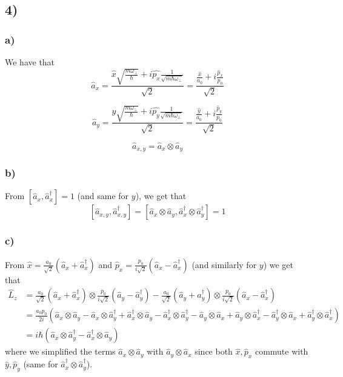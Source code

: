 \documentclass[10pt,a4paper]{book}
\begin{document}
\subsection*{4)}

\subsubsection*{a)}

We have that 
$$\hat{a}_x=\frac{\hat{x}\sqrt{\frac{m\omega_{\perp}}{\hbar}}+i\hat{p_x}\frac{1}{\sqrt{m\hbar\omega_{\perp}}}}{\sqrt{2}}=\frac{\frac{\hat{x}}{a_0}+i\frac{\hat{p}_x}{p_0}}{\sqrt{2}}$$

$$\hat{a}_y=\frac{\hat{y}\sqrt{\frac{m\omega_{\perp}}{\hbar}}+i\hat{p_y}\frac{1}{\sqrt{m\hbar\omega_{\perp}}}}{\sqrt{2}}=\frac{\frac{\hat{y}}{a_0}+i\frac{\hat{p}_y}{p_0}}{\sqrt{2}}$$

$$\hat{a}_{x,y}=\hat{a}_x\otimes\hat{a}_y$$

\subsubsection*{b)}
From $[\hat{a}_x,\hat{a}^{\dagger}_x]=1$ (and same for $y$), we get that 
$$[\hat{a}_{x,y},\hat{a}^{\dagger}_{x,y}]=[\hat{a}_x\otimes\hat{a}_y,\hat{a}^{\dagger}_x\otimes \hat{a}^{\dagger}_y]=1$$

\subsubsection*{c)}

From $\hat{x}=\frac{a_0}{\sqrt{2}}(\hat{a}_x+\hat{a}^{\dagger}_x)$ and $\hat{p}_x=\frac{p_0}{i\sqrt{2}}(\hat{a}_x-\hat{a}^{\dagger}_x)$ (and similarly for $y$) we get that
\begin{align*}
\hat{L}_z&=\frac{a_0}{\sqrt{2}}(\hat{a}_x+\hat{a}^{\dagger}_x)\otimes \frac{p_0}{i\sqrt{2}}(\hat{a}_y-\hat{a}^{\dagger}_y)-\frac{a_0}{\sqrt{2}}(\hat{a}_y+\hat{a}^{\dagger}_y)\otimes \frac{p_0}{i\sqrt{2}}(\hat{a}_x-\hat{a}^{\dagger}_x)\\
&=\frac{a_0p_0}{2i}(\hat{a}_x\otimes \hat{a}_y-\hat{a}_x\otimes \hat{a}_y^{\dagger}+\hat{a}_x^{\dagger}\otimes \hat{a}_y-\hat{a}_x^{\dagger}\otimes \hat{a}_y^{\dagger}-\hat{a}_y\otimes \hat{a}_x+\hat{a}_y\otimes \hat{a}_x^{\dagger}-\hat{a}_y^{\dagger}\otimes \hat{a}_x+\hat{a}_y^{\dagger}\otimes \hat{a}_x^{\dagger})\\
&=i\hbar(\hat{a}_x\otimes \hat{a}_y^{\dagger}-\hat{a}^{\dagger}_x\otimes \hat{a}_y)
\end{align*}
where we simplified the terms $\hat{a}_x\otimes \hat{a}_y$ with $\hat{a}_y\otimes \hat{a}_x$ since both $\hat{x},\hat{p}_x$ commute with $\hat{y},\hat{p}_y$ (same for $\hat{a}_x^{\dagger}\otimes \hat{a}_y^{\dagger}$).
\end{document}
